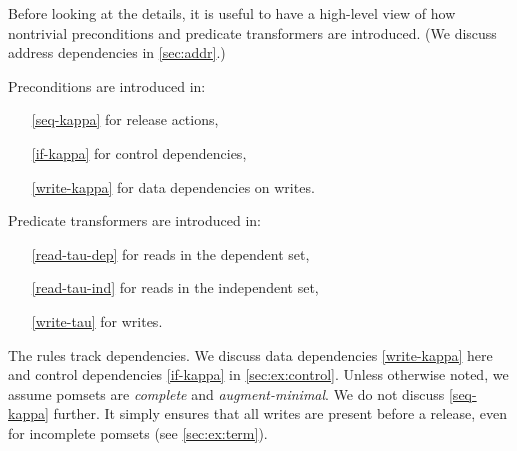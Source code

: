 Before looking at the details, it is useful to have a high-level view of how
nontrivial preconditions and predicate transformers are introduced.  (We
discuss address dependencies in \textsection\ref{sec:addr}.)
\begin{multicols}{2}
  Preconditions are introduced in: 
  \begin{itemize}
  \item[\eqref{seq-kappa}] for release actions,
  \item[\eqref{if-kappa}] for control dependencies, 
  \item[\eqref{write-kappa}] for data dependencies on writes.
  \end{itemize}

  Predicate transformers are introduced in:
  \begin{itemize}
  \item[\eqref{read-tau-dep}] for reads in the dependent set,
  \item[\eqref{read-tau-ind}] for reads in the independent set,
  \item[\eqref{write-tau}] for writes.
  \end{itemize}
\end{multicols}


The rules track dependencies.  We discuss data dependencies \eqref{write-kappa}
here and control dependencies \eqref{if-kappa} in
\textsection\ref{sec:ex:control}.  Unless otherwise noted, we assume pomsets
are \emph{complete} and \emph{augment-minimal}.  We do not discuss
\ref{seq-kappa} further.  It simply ensures that all writes are
present before a release, even for incomplete pomsets (see
\textsection\ref{sec:ex:term}).


